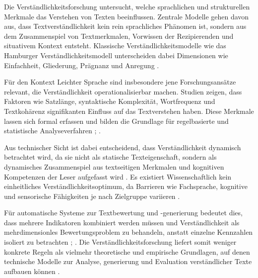 
Die Verständlichkeitsforschung untersucht, welche sprachlichen und strukturellen Merkmale das Verstehen von Texten beeinflussen.
Zentrale Modelle gehen davon aus, dass Textverständlichkeit kein rein sprachliches Phänomen ist, sondern aus dem Zusammenspiel von Textmerkmalen, Vorwissen der Rezipierenden und situativem Kontext entsteht.
Klassische Verständlichkeitsmodelle wie das Hamburger Verständlichkeitsmodell unterscheiden dabei Dimensionen wie Einfachheit, Gliederung, Prägnanz und Anregung \cite[S. 15-28]{langer_sich_2019}.

Für den Kontext Leichter Sprache sind insbesondere jene Forschungsansätze relevant, die Verständlichkeit operationalisierbar machen.
Studien zeigen, dass Faktoren wie Satzlänge, syntaktische Komplexität, Wortfrequenz und Textkohärenz signifikanten Einfluss auf das Textverstehen haben.
Diese Merkmale lassen sich formal erfassen und bilden die Grundlage für regelbasierte und statistische Analyseverfahren \cite[S. 73-92]{maas_leichte_2015}; \cite[S. 87-94]{maas_handbuch_2018}.

Aus technischer Sicht ist dabei entscheidend, dass Verständlichkeit dynamisch betrachtet wird, da sie nicht als statische Texteigenschaft, sondern als dynamisches Zusammenspiel aus textseitigen Merkmalen und kognitiven Kompetenzen der Leser aufgefasst wird \cite[S. 32-33, 125]{maas_handbuch_2018}.
Es existiert Wissenschaftlich kein einheitliches Verständlichkeitsoptimum, da Barrieren wie Fachsprache, kognitive und sensorische Fähigkeiten je nach Zielgruppe variieren \cite[S. 21-22]{maas_handbuch_2018}.

Für automatische Systeme zur Textbewertung und -generierung bedeutet dies, dass mehrere Indikatoren kombiniert werden müssen und Verständlichkeit als mehrdimensionles Bewertungsproblem zu behandeln, anstatt einzelne Kennzahlen isoliert zu betrachten \cite[S. 41-43]{maas_handbuch_2018}; \cite[S. 95-99]{maas_handbuch_2018}.
Die Verständlichkeitsforschung liefert somit weniger konkrete Regeln als vielmehr theoretische und empirische Grundlagen, auf denen technische Modelle zur Analyse, generierung und Evaluation verständlicher Texte aufbauen können \cite[S. 101-108]{maas_leichte_2015}.